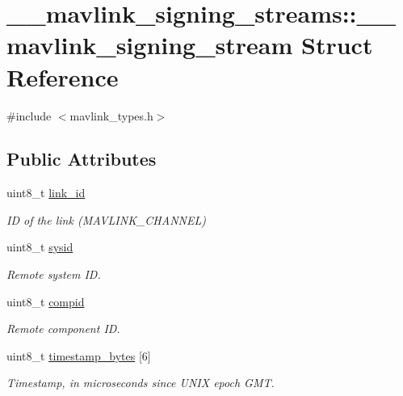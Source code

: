 \hypertarget{struct____mavlink__signing__streams_1_1____mavlink__signing__stream}{}\section{\+\_\+\+\_\+mavlink\+\_\+signing\+\_\+streams\+::\+\_\+\+\_\+mavlink\+\_\+signing\+\_\+stream Struct Reference}
\label{struct____mavlink__signing__streams_1_1____mavlink__signing__stream}


{\ttfamily \#include $<$mavlink\+\_\+types.\+h$>$}

\subsection*{Public Attributes}
\begin{DoxyCompactItemize}
\item 
uint8\+\_\+t \mbox{\hyperlink{struct____mavlink__signing__streams_1_1____mavlink__signing__stream_a460c2c122f9a4350bcbdeaea3e5aa534}{link\+\_\+id}}
\begin{DoxyCompactList}\small\item\em ID of the link (M\+A\+V\+L\+I\+N\+K\+\_\+\+C\+H\+A\+N\+N\+EL) \end{DoxyCompactList}\item 
uint8\+\_\+t \mbox{\hyperlink{struct____mavlink__signing__streams_1_1____mavlink__signing__stream_ab8826081c0e1c8635ab2b706e046b4f6}{sysid}}
\begin{DoxyCompactList}\small\item\em Remote system ID. \end{DoxyCompactList}\item 
uint8\+\_\+t \mbox{\hyperlink{struct____mavlink__signing__streams_1_1____mavlink__signing__stream_abdeaafd43daa73f208160ac46d510389}{compid}}
\begin{DoxyCompactList}\small\item\em Remote component ID. \end{DoxyCompactList}\item 
uint8\+\_\+t \mbox{\hyperlink{struct____mavlink__signing__streams_1_1____mavlink__signing__stream_ac2dacf1fa619460cfe828939921ec091}{timestamp\+\_\+bytes}} \mbox{[}6\mbox{]}
\begin{DoxyCompactList}\small\item\em Timestamp, in microseconds since U\+N\+IX epoch G\+MT. \end{DoxyCompactList}\end{DoxyCompactItemize}


